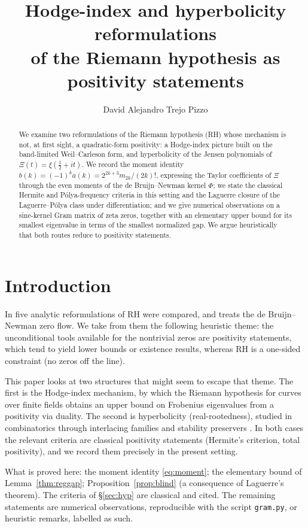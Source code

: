 \documentclass[11pt]{amsart}
\title[Hodge-index and hyperbolicity reformulations]{Hodge-index and hyperbolicity reformulations\\[3pt]
of the Riemann hypothesis as positivity statements}
\author{David Alejandro Trejo Pizzo}
\theoremstyle{definition}
\theoremstyle{remark}
\newcommand{\half}{\tfrac12}
\begin{document}
\begin{abstract}
We examine two reformulations of the Riemann hypothesis (RH) whose mechanism is not, at first sight, a
quadratic-form positivity: a Hodge-index picture built on the band-limited Weil--Carleson form, and
hyperbolicity of the Jensen polynomials of $\Xi(t)=\xi(\half+it)$. We record the moment identity
$b(k)=(-1)^ka(k)=2^{2k+3}m_{2k}/(2k)!$, expressing the Taylor coefficients of $\Xi$ through the even moments of the
de Bruijn--Newman kernel $\Phi$; we state the classical Hermite and Pólya-frequency criteria in this setting and
the Laguerre closure of the Laguerre--Pólya class under differentiation; and we give numerical observations on a
sine-kernel Gram matrix of zeta zeros, together with an elementary upper bound for its smallest eigenvalue in
terms of the smallest normalized gap. We argue heuristically that both routes reduce to positivity statements.
\end{abstract}

\maketitle

\tableofcontents
\newpage

\section{Introduction}\label{sec:intro}
In \cite{P12} five analytic reformulations of RH were compared, and \cite{P13} treats the de Bruijn--Newman
zero flow. We take from them the following heuristic
theme: the unconditional tools available for the nontrivial zeros are positivity statements, which tend
to yield lower bounds or existence results, whereas RH is a one-sided constraint (no zeros off the line).

This paper looks at two structures that might seem to escape that theme. The first is the
Hodge-index mechanism, by which the Riemann hypothesis for curves over finite fields
\cite{Weil,MattuckTate,Groth} obtains an upper bound on Frobenius eigenvalues from a positivity via duality. The second is
hyperbolicity (real-rootedness), studied in combinatorics through interlacing families
\cite{MSS1,MSS} and stability preservers \cite{BB1,BB2}. In both cases the relevant criteria are classical
positivity statements (Hermite's criterion, total positivity), and we record them precisely in the present
setting.

What is proved here: the moment identity \eqref{eq:moment}; the elementary bound of
Lemma~\ref{thm:reggap}; Proposition~\ref{prop:blind} (a consequence of Laguerre's theorem). The criteria
of \S\ref{sec:hyp} are classical and cited. The remaining statements are numerical observations, reproducible
with the script \texttt{gram.py}, or heuristic remarks, labelled as such.
\end{document}
